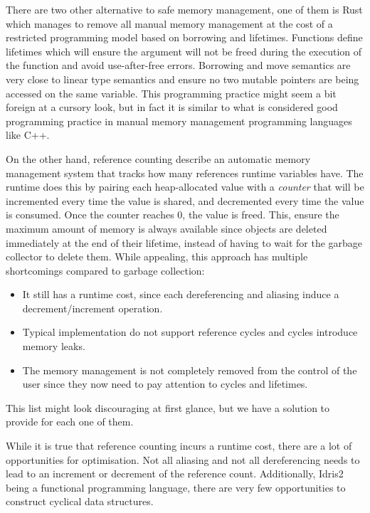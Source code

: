 \documentclass[
]{article}
\providecommand{\tightlist}{%
  \setlength{\itemsep}{0pt}\setlength{\parskip}{0pt}}
\begin{document}
There are two other alternative to safe memory management, one of them
is Rust \cite{rust} which manages to remove all manual memory management
at the cost of a restricted programming model based on borrowing and
lifetimes. Functions define lifetimes which will ensure the argument
will not be freed during the execution of the function and avoid
use-after-free errors. Borrowing and move semantics are very close to
linear type semantics and ensure no two mutable pointers are being
accessed on the same variable. This programming practice might seem a
bit foreign at a cursory look, but in fact it is similar to what is
considered good programming practice in manual memory management
programming languages like C++.

On the other hand, reference counting describe an automatic memory
management system that tracks how many references runtime variables
have. The runtime does this by pairing each heap-allocated value with a
\emph{counter} that will be incremented every time the value is shared,
and decremented every time the value is consumed. Once the counter
reaches 0, the value is freed. This, ensure the maximum amount of memory
is always available since objects are deleted immediately at the end of
their lifetime, instead of having to wait for the garbage collector to
delete them. While appealing, this approach has multiple shortcomings
compared to garbage collection:

\begin{itemize}
\tightlist
\item
  It still has a runtime cost, since each dereferencing and aliasing
  induce a decrement/increment operation.
\item
  Typical implementation do not support reference cycles and cycles
  introduce memory leaks.
\item
  The memory management is not completely removed from the control of
  the user since they now need to pay attention to cycles and lifetimes.
\end{itemize}

This list might look discouraging at first glance, but we have a
solution to provide for each one of them.

While it is true that reference counting incurs a runtime cost, there
are a lot of opportunities for optimisation. Not all aliasing and not
all dereferencing needs to lead to an increment or decrement of the
reference count. Additionally, Idris2 being a functional programming
language, there are very few opportunities to construct cyclical data
structures.
\end{document}
